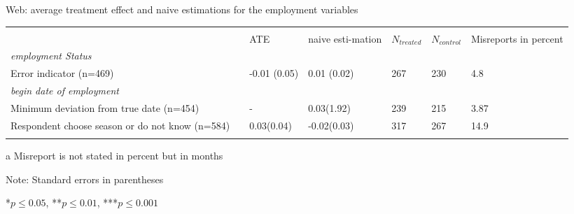 \begin{threeparttable}[h]
	\centering
	\singlespacing
	\caption{Web: average treatment effect and naive estimations for the employment variables}
	\label{ATEwebemploy}
	\begin{tabularx}{\textwidth}{@{}Xp{0.1cm}p{1.5cm}p{1.5cm}p{1cm}p{1cm}p{1.5cm}}
		&               &     &       &     &    &       \\
		& & ATE & naive \newline esti-mation & \(N_{treated}\) & \(N_{control}\) & Misreports \newline in \newline percent \\
		
		\textit{employment Status}                                   	 							&               &   &  &            &                & \\ \midrule\addlinespace 
		Error indicator (n=469) &	 &-0.01 \newline (0.05)    &0.01 \newline (0.02)           &267 & 230 &4.8               \\ \addlinespace \addlinespace
		\textit{begin date of employment}                               								&&&& & \\ \midrule\addlinespace
		Minimum deviation from true date (n=454) &            &-&0.03\newline (1.92)&239&215&3.87\tnote{a} \\ \addlinespace \addlinespace
		Respondent choose season or do not know (n=584)  &     &0.03\newline (0.04)&-0.02\newline (0.03)&317&267&14.9 \\ \addlinespace
		\bottomrule                         
	\end{tabularx}
	\begin{tablenotes}
		\begin{footnotesize}
			\item[a] Misreport is not stated in percent but in months
			\item{Note: Standard errors in parentheses}
			\item{*\(p \le 0.05\), **\(p \le 0.01\), ***\(p \le 0.001\)}
		\end{footnotesize}
	\end{tablenotes}
\end{threeparttable}
